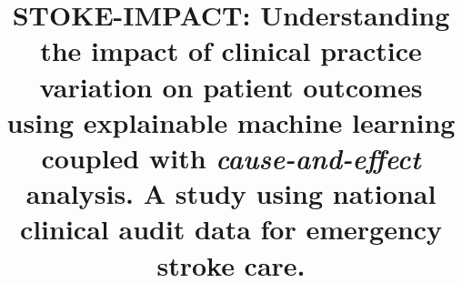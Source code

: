 
\title{STOKE-IMPACT: Understanding the impact of clinical practice variation on patient outcomes using explainable machine learning coupled with \textit{cause-and-effect} analysis. A study using national clinical audit data for emergency stroke care.}
\author{} %
\date{} %